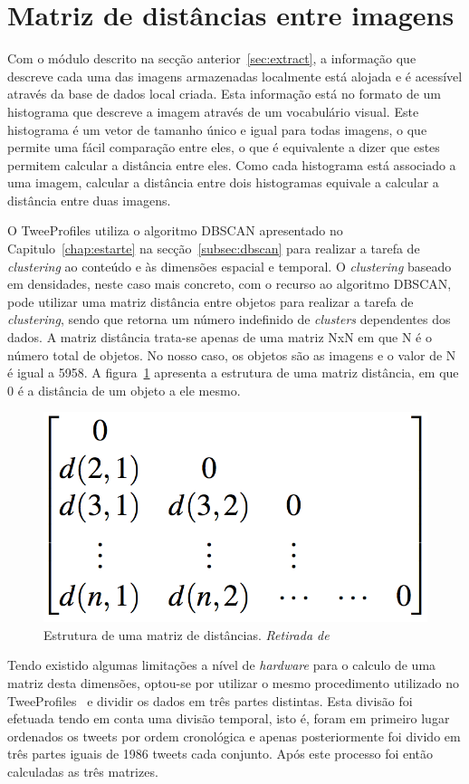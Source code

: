 \section{Matriz de distâncias entre imagens}

Com o módulo descrito na secção anterior~\ref{sec:extract}, a informação que descreve cada uma das imagens armazenadas localmente está alojada e é acessível através da base de dados local criada. Esta informação está no formato de um histograma que descreve a imagem através de um vocabulário visual. Este histograma é um vetor de tamanho único e igual para todas imagens, o que permite uma fácil comparação entre eles, o que é equivalente a dizer que estes permitem calcular a distância entre eles. Como cada histograma está associado a uma imagem, calcular a distância entre dois histogramas equivale a calcular a distância entre duas imagens.

O TweeProfiles utiliza o algoritmo DBSCAN apresentado no Capitulo~\ref{chap:estarte} na secção~\ref{subsec:dbscan} para realizar a tarefa de \textit{clustering} ao conteúdo e às dimensões espacial e temporal. O \textit{clustering} baseado em densidades, neste caso mais concreto, com o recurso ao algoritmo DBSCAN, pode utilizar uma matriz distância entre objetos para realizar a tarefa de \textit{clustering}, sendo que retorna um número indefinido de \textit{clusters} dependentes dos dados. A matriz distância trata-se apenas de uma matriz NxN em que N é o número total de objetos. No nosso caso, os objetos são as imagens e o valor de N é igual a 5958. A figura~\ref{fig:matriz} apresenta a estrutura de uma matriz distância, em que 0 é a distância de um objeto a ele mesmo.

\begin{figure}[h]
\centering
\includegraphics[width=0.3\linewidth]{./figures/matrizdist}
\caption{Estrutura de uma matriz de distâncias. \textit{Retirada de}~\cite{Han2006}}
\label{fig:matriz}
\end{figure}

Tendo existido algumas limitações a nível de \textit{hardware} para o calculo de uma matriz desta dimensões, optou-se por utilizar o mesmo procedimento utilizado no TweeProfiles~\cite{Cunha2013} e dividir os dados em três partes distintas. Esta divisão foi efetuada tendo em conta uma divisão temporal, isto é, foram em primeiro lugar ordenados os tweets por ordem cronológica e apenas posteriormente foi divido em três partes iguais de 1986 tweets cada conjunto. Após este processo foi então calculadas as três matrizes.
 
